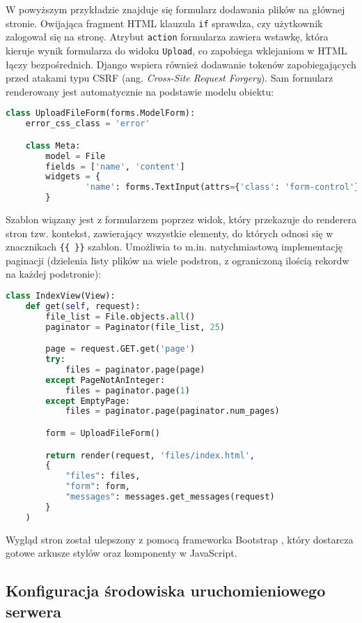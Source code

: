 \documentclass[10pt,a4paper]{article}
\begin{document}
W powyższym przykładzie znajduje się formularz dodawania plików na głównej stronie. 
Owijająca fragment HTML klauzula \texttt{if} sprawdza, czy użytkownik zalogował się na stronę.
Atrybut \texttt{action} formularza zawiera wstawkę, która kieruje wynik formularza do widoku
\texttt{Upload}, co zapobiega wklejaniom w HTML łączy bezpośrednich. Django wspiera również
dodawanie tokenów zapobiegających przed atakami typu CSRF (ang. \emph{Cross-Site Request
Forgery}). Sam formularz renderowany jest automatycznie na podstawie modelu obiektu:

\begin{lstlisting}[language=python,caption=Przykładowy formularz -- dodawanie plików]
class UploadFileForm(forms.ModelForm):
    error_css_class = 'error'

    class Meta:
        model = File
        fields = ['name', 'content']
        widgets = {
                'name': forms.TextInput(attrs={'class': 'form-control'})
        }
\end{lstlisting}

Szablon wiązany jest z formularzem poprzez widok, który przekazuje do renderera stron tzw.
kontekst, zawierający wszystkie elementy, do których odnosi się w znacznikach \texttt{\{\{ \}\}}
szablon. Umożliwia to m.in. natychmiastową implementację paginacji (dzielenia listy plików
na wiele podstron, z ograniczoną ilością rekordw na każdej podstronie):
\begin{lstlisting}[language=python,caption=Widok łączący formularz oraz szablon]
class IndexView(View):
    def get(self, request):
        file_list = File.objects.all()
        paginator = Paginator(file_list, 25)

        page = request.GET.get('page')
        try:
            files = paginator.page(page)
        except PageNotAnInteger:
            files = paginator.page(1)
        except EmptyPage:
            files = paginator.page(paginator.num_pages)

        form = UploadFileForm()

        return render(request, 'files/index.html', 
		{
			"files": files,
			"form": form,
			"messages": messages.get_messages(request) 
		}
	)
\end{lstlisting}
Wygląd stron został ulepszony z pomocą frameworka Bootstrap \cite{bootstrap}, który dostarcza
gotowe arkusze stylów oraz komponenty w JavaScript.

\subsection{Konfiguracja środowiska uruchomieniowego serwera}
\end{document}
